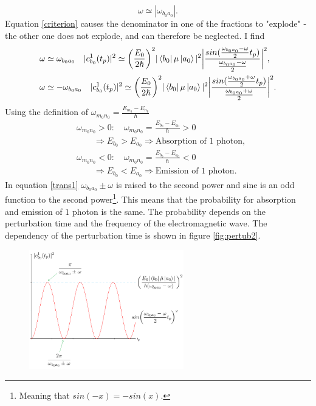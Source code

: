 \begin{example}
	\begin{equation}
		\omega\simeq|\omega_{b_0a_0}|.
		\label{criterion}
	\end{equation} 
	Equation \eqref{criterion} causes the denominator in one of the fractions to "explode" -the other one does not explode, and can therefore be neglected. I find 
	\begin{equation}
		\begin{split}
			&\omega\simeq\omega_{b_0a_0} \quad |c^1_{b_0}(t_p)|^2\simeq\bigg(\frac{E_0}{2\hbar}\bigg)^2|\bra{b_0}\mu\ket{a_0}|^2\bigg|\frac{sin(\frac{\omega_{b_0a_0}-\omega}{2}t_p)}{\frac{\omega_{b_0a_0}-\omega}{2}}\bigg|^2,\\
			&\omega\simeq-\omega_{b_0a_0} \quad |c^1_{b_0}(t_p)|^2\simeq\bigg(\frac{E_0}{2\hbar}\bigg)^2|\bra{b_0}\mu\ket{a_0}|^2\bigg|\frac{sin(\frac{\omega_{b_0a_0}+\omega}{2}t_p)}{\frac{\omega_{b_0a_0}+\omega}{2}}\bigg|^2.
		\end{split}
		\label{trans1}
	\end{equation} 
	Using the definition of $\omega_{m_0n_0}=\frac{E_{m_0}-E_{n_0}}{\hbar}$
	\begin{equation}
		\begin{split}
			&\omega_{m_0n_0}>0:\quad\omega_{m_0n_0}=\frac{E_{b_0}-E_{a_0}}{\hbar}>0\\
			&\qquad \Rightarrow E_{b_0}>E_{a_0}\Rightarrow \mbox{Absorption of $1$ photon},\\
			&\omega_{m_0n_0}<0:\quad\omega_{m_0n_0}=\frac{E_{b_0}-E_{a_0}}{\hbar}<0\\
			&\qquad  \Rightarrow E_{b_0}<E_{a_0}\Rightarrow \mbox{Emission of $1$ photon}.
		\end{split}
	\end{equation} 
	In equation \eqref{trans1} $\omega_{b_0a_0}\pm\omega$ is raised to the second power and sine is an odd function to the second power\footnote{Meaning that $sin(-x)=-sin(x)$.}. This means that the probability for absorption and emission of $1$ photon is the same. The probability depends on the perturbation time and the frequency of the electromagnetic wave. The dependency of the perturbation time is shown in figure \ref{fig:pertub2}.
	\begin{figure}[ht]
		\captionsetup{width=1\textwidth}
		\centering
		\includegraphics[width=0.6\textwidth]{figures/tipertub1}

\end{figure}
\end{example}
